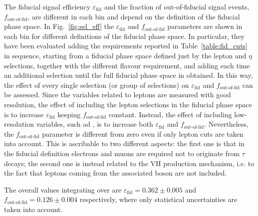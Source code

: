 The fiducial signal efficiency $\varepsilon_\mathrm{fid}$ and the fraction of out-of-fiducial signal events, $f_{\text{out-of-fid}}$, are different in each \pth bin and depend on the definition of the fiducial phase space. In Fig.~\ref{fig:sel_eff} the $\varepsilon_\mathrm{fid}$ and $f_{\text{out-of-fid}}$ parameters are shown in each \pth bin for different definitions of the fiducial phase space. In particular, they have been evaluated adding the requirements reported in Table~\ref{table:fid_cuts} in sequence, starting from a fiducial phase space defined just by the lepton \pt and $\eta$ selections, together with the different flavour requirement, and adding each time an additional selection until the full fiducial phase space in obtained. In this way, the effect of every single selection (or group of selections) on $\varepsilon_\mathrm{fid}$ and $f_{\text{out-of-fid}}$ can be assessed. Since the variables related to leptons are measured with good resolution, the effect of including the lepton selections in the fiducial phase space is to increase $\varepsilon_\mathrm{fid}$ keeping $f_{\text{out-of-fid}}$ constant. Instead, the effect of including low-resolution variables, such ad \mt, is to increase both $\varepsilon_\mathrm{fid}$ and $f_{\text{out-of-fid}}$. Nevertheless, the $f_{\text{out-of-fid}}$ parameter is different from zero even if only lepton cuts are taken into account. This is ascribable to two different aspects: the first one is that in the fiducial definition electrons and muons are required not to originate from $\tau$ decays; the second one is instead related to the VH production mechanism, i.e. to the fact that leptons coming from the associated boson are not included.

The overall values integrating over \pth are $\varepsilon_\mathrm{fid}=0.362\pm{0.005}$ and $f_{\text{out-of-fid}}=0.126\pm0.004$ respectively, where only statistical uncertainties are taken into account.

